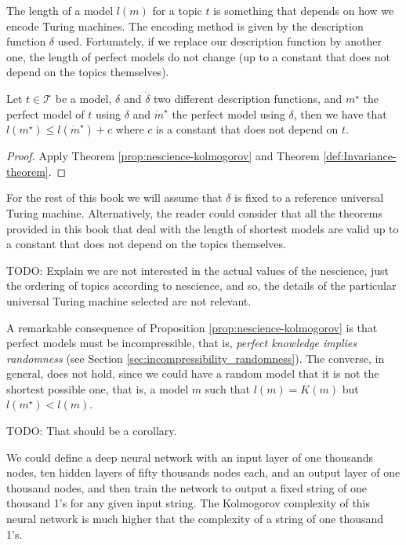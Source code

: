 The length of a model $l \left( m \right)$ for a topic $t$ is something that depends on how we encode Turing machines. The encoding method is given by the description function $\delta$ used. Fortunately, if we replace our description function by another one, the length of perfect models do not change (up to a constant that does not depend on the topics themselves).

\begin{corollary}
Let $t \in \mathcal{T}$ be a model, $\delta$ and $\dot{\delta}$ two different description functions, and $m^{\star}$ the perfect model of $t$ using $\delta$ and $\dot{m}^{\star}$ the perfect model using $\dot{\delta}$, then we have that $l \left( m^{\star} \right) \leq l \left( \dot{m}^{\star} \right) + c$ where $c$ is a constant that does not depend on $t$.
\end{corollary}
\begin{proof}
Apply Theorem \ref{prop:nescience-kolmogorov} and Theorem \ref{def:Invariance-theorem}.
\end{proof}

For the rest of this book we will assume that $\delta$ is fixed to a reference universal Turing machine. Alternatively, the reader could consider that all the theorems provided in this book that deal with the length of shortest models are valid up to a constant that does not depend on the topics themselves.

{\color{red} TODO: Explain we are not interested in the actual values of the nescience, just the ordering of topics according to nescience, and so, the details of the particular universal Turing machine selected are not relevant.}

A remarkable consequence of Proposition \ref{prop:nescience-kolmogorov} is that perfect models must be incompressible, that is, \emph{perfect knowledge implies randomness} (see Section \ref{sec:incompressibility_randomness}). The converse, in general, does not hold, since we could have a random model that it is not the shortest possible one, that is, a model $m$ such that $l(m) = K(m)$ but $l(m^{\star}) < l(m)$.

{\color{red} TODO: That should be a corollary.}

\begin{example}
\label{ex:description_neural}
We could define a deep neural network with an input layer of one thousands nodes, ten hidden layers of fifty thousands nodes each, and an output layer of one thousand nodes, and then train the network to output a fixed string of one thousand 1's for any given input string. The Kolmogorov complexity of this neural network is much higher that the complexity of a string of one thousand 1's.
\end{example}


